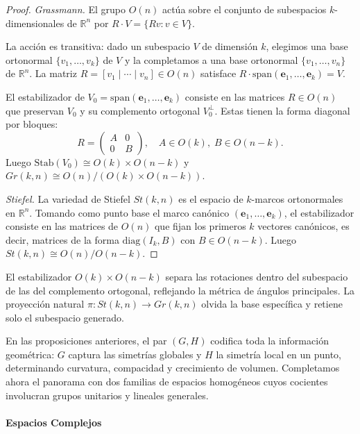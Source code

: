 \begin{proof}
\textit{Grassmann.} El grupo $O(n)$ actúa sobre el conjunto de subespacios $k$-dimensionales de $\mathbb{R}^n$ por $R \cdot V = \{Rv : v \in V\}$.

La acción es transitiva: dado un subespacio $V$ de dimensión $k$, elegimos una base ortonormal $\{v_1,\ldots,v_k\}$ de $V$ y la completamos a una base ortonormal $\{v_1,\ldots,v_n\}$ de $\mathbb{R}^n$. La matriz $R = [v_1 \mid \cdots \mid v_n] \in O(n)$ satisface $R \cdot \mathrm{span}(\mathbf{e}_1,\ldots,\mathbf{e}_k) = V$.

El estabilizador de $V_0 = \mathrm{span}(\mathbf{e}_1,\ldots,\mathbf{e}_k)$ consiste en las matrices $R \in O(n)$ que preservan $V_0$ y su complemento ortogonal $V_0^\perp$. Estas tienen la forma diagonal por bloques:
\[
R = \begin{pmatrix} A & 0 \\ 0 & B \end{pmatrix}, \quad A \in O(k), \; B \in O(n-k).
\]
Luego $\mathrm{Stab}(V_0) \cong O(k) \times O(n-k)$ y $Gr(k,n) \cong O(n)/(O(k) \times O(n-k))$.

\textit{Stiefel.} La variedad de Stiefel $St(k,n)$ es el espacio de $k$-marcos ortonormales en $\mathbb{R}^n$. Tomando como punto base el marco canónico $(\mathbf{e}_1,\ldots,\mathbf{e}_k)$, el estabilizador consiste en las matrices de $O(n)$ que fijan los primeros $k$ vectores canónicos, es decir, matrices de la forma $\mathrm{diag}(I_k, B)$ con $B \in O(n-k)$. Luego $St(k,n) \cong O(n)/O(n-k)$.
\end{proof}

El estabilizador $O(k) \times O(n{-}k)$ separa las rotaciones dentro del subespacio de las del complemento ortogonal, reflejando la métrica de ángulos principales. La proyección natural $\pi\colon St(k,n) \to Gr(k,n)$ olvida la base específica y retiene solo el subespacio generado.

En las proposiciones anteriores, el par $(G, H)$ codifica toda la información geométrica: $G$ captura las simetrías globales y $H$ la simetría local en un punto, determinando curvatura, compacidad y crecimiento de volumen. Completamos ahora el panorama con dos familias de espacios homogéneos cuyos cocientes involucran grupos unitarios y lineales generales.

\paragraph{Espacios Complejos}

